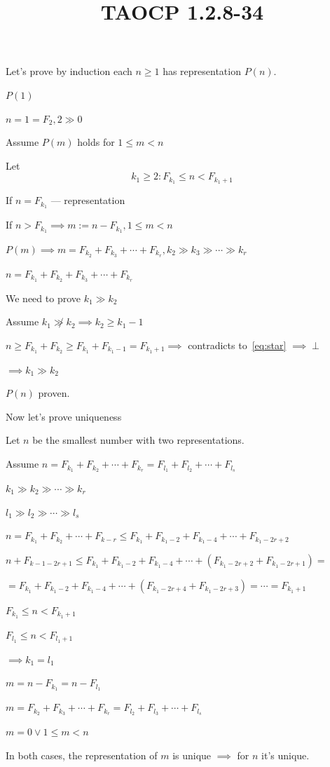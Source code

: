 \documentclass{article}
\title{TAOCP 1.2.8\mbox{-}34}
\begin{document}
\maketitle

Let's prove by induction each \( n \geq 1 \) has representation \( P(n) \).

\( P(1) \)

\( n = 1 = F_{2}, 2 \gg 0 \)

Assume \( P(m) \) holds for \( 1 \leq m < n \)

Let
\[k_{1} \geq 2: F_{k_{1}} \leq n < F_{k_{1}+1} \tag{*}\label{eq:star}\]

If \( n = F_{k_{1}} \) --- representation

If \( n > F_{k_{1}} \implies m := n - F_{k_{1}}, 1 \leq m < n \)

\( P(m) \implies m = F_{k_{2}} + F_{k_{3}} + \cdots + F_{k_{r}}, k_{2} \gg k_{3} \gg \cdots \gg k_{r} \)

\( n = F_{k_{1}} + F_{k_{2}} + F_{k_{3}} + \cdots + F_{k_{r}} \)

We need to prove \( k_{1} \gg k_{2} \)

Assume \( k_{1} \not\gg k_{2} \implies k_{2} \geq k_{1} - 1 \)

\( n \geq F_{k_{1}} + F_{k_{2}} \geq F_{k_{1}} + F_{k_{1}-1} = F_{k_{1} + 1} \implies \) contradicts to~\eqref{eq:star} \( \implies \perp \)

\( \implies k_{1} \gg k_{2} \)

\( P(n) \) proven.

Now let's prove uniqueness

Let \( n \) be the smallest number with two representations.

Assume \( n = F_{k_{1}} + F_{k_{2}} + \cdots + F_{k_{r}} = F_{l_{1}} + F_{l_{2}} + \cdots + F_{l_{s}} \)

\( k_{1} \gg k_{2} \gg \cdots \gg k_{r} \)

\( l_{1} \gg l_{2} \gg \cdots \gg l_{s} \)

\( n = F_{k_{1}} + F_{k_{2}} + \cdots + F_{k-r} \leq F_{k_{1}} + F_{k_{1} - 2} + F_{k_{1} - 4} + \cdots + F_{k_{1} - 2r + 2} \)

\( n + F_{k-1-2r+1} \leq F_{k_{1}} + F_{k_{1} - 2} + F_{k_{1} - 4} + \cdots + (F_{k_{1} - 2r + 2} + F_{k_{1} - 2r + 1}) = \)

\( = F_{k_{1}} + F_{k_{1} - 2} + F_{k_{1} - 4} + \cdots + (F_{k_{1} - 2r + 4} + F_{k_{1} - 2r + 3}) = \cdots = F_{k_{1} + 1} \)

\( F_{k_{1}} \leq n < F_{k_{1} + 1} \)

\( F_{l_{1}} \leq n < F_{l_{1} + 1} \)

\( \implies k_{1} = l_{1} \)

\( m = n - F_{k_{1}} = n - F_{l_{1}} \)

\( m = F_{k_{2}} + F_{k_{3}} + \cdots + F_{k_{r}} = F_{l_{2}} + F_{l_{3}} + \cdots + F_{l_{s}} \)

\( m = 0 \lor 1 \leq m < n \)

In both cases, the representation of \( m \) is unique \( \implies \) for \( n \) it's unique.
\end{document}
